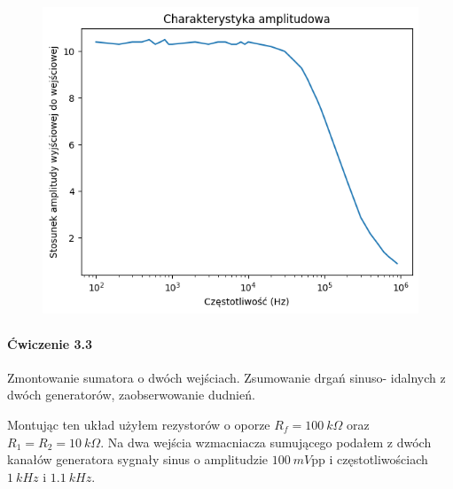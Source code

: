 \documentclass[14pt, table]{extarticle}
\begin{document}
\begin{figure}[H]
\includegraphics[scale=0.8]{D0}
\centering
\captionsetup{labelformat=empty}
\caption{}
\end{figure}

\newpage
\paragraph{Ćwiczenie 3.3 \\}
Zmontowanie sumatora o dwóch wejściach. Zsumowanie drgań sinuso- idalnych z dwóch generatorów, zaobserwowanie dudnień.

\begin{figure}[H]
    \centering
    \subfloat[\centering ]{{\texttt{[image: C3]}}}%
    \qquad
\end{figure}

Montując ten układ użyłem rezystorów o oporze $R_f = 100 \ k \Omega$ oraz $R_1 = R_2 = 10 \ k \Omega$. Na dwa wejścia wzmacniacza sumującego podałem z dwóch kanałów generatora sygnały sinus o amplitudzie $100 \ mV$pp i częstotliwościach $1 \ kHz$ i $1.1 \ kHz$. \\
\end{document}
